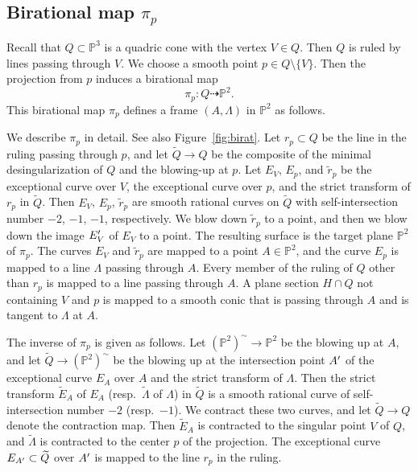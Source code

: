\documentclass{math}
\theoremstyle{plain}
\numberwithin{equation}{section}
\newcommand{\PP}{\mathord{\mathbb  P}}
\newcommand{\sprime}{\sp{\prime}}
\newcommand{\birat}{\dashrightarrow}
\newcommand{\tilQ}{\widetilde{Q}}
\begin{document}
\subsection{Birational map \texorpdfstring{$\pi_p$}{pip}}
\label{subsec:pip}
%
Recall that 
$Q\subset \PP^3$ is  a quadric cone %
with the vertex $V\in Q$.
Then $Q$ is ruled by lines passing through $V$.
We choose a smooth point $p\in Q\setminus\{V\}$.
Then the projection from $p$ induces a birational map
\[
\pi_p\colon Q\birat \PP^2.
\]
This birational map $\pi_p$ defines a frame $(A, \Lambda)$ in $\PP^2$ as follows.
\par
We describe $\pi_p$ in detail. See also Figure~\ref{fig:birat}.
Let $r_p\subset Q$ be  the line in the ruling passing through $p$, 
and let  $\tilQ\to Q$ be  the composite of the minimal desingularization of $Q$
and the blowing-up at $p$.
Let $E_V$, $E_p$, and $\tilde{r}_p$ be the exceptional curve over $V$,
the exceptional curve over $p$, and the strict transform of $r_p$ in $\tilQ$.
Then $E_V$, $E_p$, $\tilde{r}_p$ are  smooth rational curves on $\tilQ$
with self-intersection number $-2$, $-1$, $-1$, respectively.
We blow down $\tilde{r}_p$ to a point, and then 
we blow down the image $E_V\sprime$ of $E_V$ to a point.
The resulting surface is 
the target  plane $\PP^2$ of $\pi_p$.
The  curves $E_V$ and  $\tilde{r}_p$  are mapped to a point $A\in \PP^2$,
and the curve $E_p$ is mapped to a line $\Lambda$ passing through $A$.
Every member of the ruling of $Q$ other than $r_p$ is mapped to a line  passing through $A$.
A plane section $H\cap Q$ not containing $V$ and $p$ is mapped to a smooth conic 
that is  passing through $A$ and is tangent to $\Lambda$ at $A$.
\par
The inverse of $\pi_p$ is given as follows.
Let $(\PP^2)^{\mathord{\sim}}\to \PP^2$ be the blowing up at $A$,
and let $\tilQ\to (\PP^2)^{\mathord{\sim}}$  be the blowing up at the intersection point $A\sprime$
of the exceptional curve $E_A$ over $A$ and the strict transform of $\Lambda$.
Then the strict transform $\widetilde{E}_A$ of $E_A$ (resp.~$\widetilde{\Lambda}$ of $\Lambda$) in $\tilQ$ 
is a smooth rational curve of self-intersection number $-2$ (resp.~$-1$).
We contract these two curves, and 
let $\tilQ\to Q$ denote  the contraction map.
Then $\widetilde{E}_A$  is contracted to the singular point $V$ of $Q$,  
and $\widetilde{\Lambda}$ is contracted to the  center $p$
of the projection.
The exceptional curve $E_{A\sprime}\subset \tilQ$ over $A\sprime$ is 
mapped to the line $r_p$ in the ruling.  
\end{document}
